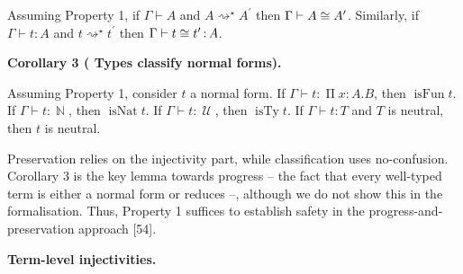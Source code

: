  
Assuming Property 1, if $\Gamma\vdash A$ and $A\operatorname{\operatorname{\rightsquigarrow}^{\star}}A^{\prime}$ then $\Gamma\vdash A\mathrel{\raisebox{-0.5pt}{$\cong$}}A^{\prime}$. Similarly, if $\Gamma\vdash t\operatorname{\mathrel{:}}A$ and $t\operatorname{\operatorname{\rightsquigarrow}^{\star}}t^{\prime}$ then $\Gamma\vdash t\mathrel{\raisebox{-0.5pt}{$\cong$}}t^{\prime}\operatorname{%
\mathrel{:}}A$.\par
 
 
 
 
\par\medskip\noindent\textbf{Corollary 3 (  Types classify normal forms).}\par
 
 
Assuming Property 1, consider $t$ a normal form. If $\Gamma\vdash t\operatorname{\mathrel{:}}\operatorname{\Pi}x:A.B$, then $\operatorname{isFun}t$. If $\Gamma\vdash t\operatorname{\mathrel{:}}\operatorname{\mathbb{N}}$, then $\operatorname{isNat}t$. If $\Gamma\vdash t\operatorname{\mathrel{:}}\operatorname{\mathcal{U}}$, then $\operatorname{isTy}t$. If $\Gamma\vdash t\operatorname{\mathrel{:}}T$ and $T$ is neutral, then $t$ is neutral.\par
 
 
 
 
Preservation relies on the injectivity part, while classification uses no-confusion. Corollary 3 is the key lemma towards progress – the fact that every well-typed term is either a normal form or reduces –, although we do not show this in the formalisation. Thus, Property 1 suffices to establish safety in the progress-and-preservation approach [54].\par
 
 
 
 
\par\medskip\noindent\textbf{Term-level injectivities.}\par
 
 
